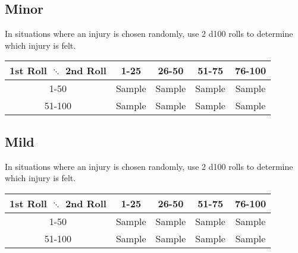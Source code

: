 \subsection{Minor}
In situations where an injury is chosen randomly, use 2 d100 rolls to determine which injury is felt.
\begin{center}
\begin{tabular}{c | c | c | c | c}
1st Roll $\ddots$ 2nd Roll & 1-25 & 26-50 & 51-75 & 76-100 \\
\hline
1-50 & Sample & Sample & Sample & Sample\\
\hline
51-100 & Sample & Sample & Sample & Sample\\
\end{tabular}
\end{center}
\begin{multicols}{2}

\end{multicols}
\subsection{Mild}
In situations where an injury is chosen randomly, use 2 d100 rolls to determine which injury is felt.
\begin{center}
\begin{tabular}{c | c | c | c | c}
1st Roll $\ddots$ 2nd Roll & 1-25 & 26-50 & 51-75 & 76-100 \\
\hline
1-50 & Sample & Sample & Sample & Sample\\
\hline
51-100 & Sample & Sample & Sample & Sample\\
\end{tabular}
\end{center}
\begin{multicols}{2}

\end{multicols}
